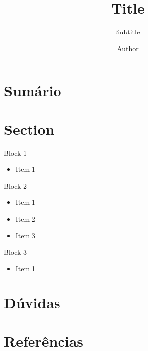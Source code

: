 \documentclass{custom-beamer}
\title{Title}
\subtitle{Subtitle}
\author{Author}
\institute{Institute}
\date{\the\year}
\begin{document}
\begin{frame}[fragile]
\titlepage
\end{frame}

\section{Sumário}

\begin{frame}[fragile]
\tableofcontents
\end{frame}

\section{Section}

\begin{frame}[fragile]
\begin{block}{Block 1}
\begin{itemize}
	\item Item 1 \cite{vapnik2000nature}
\end{itemize}
\end{block}
\begin{block}{Block 2}
\begin{itemize}
	\item Item 1
	\item Item 2
	\item Item 3
\end{itemize}
\end{block}
\begin{block}{Block 3}
\begin{itemize}
	\item Item 1
\end{itemize}
\end{block}
\end{frame}

\section{Dúvidas}

\begin{frame}[fragile]
\questionspage
\end{frame}

\section{Referências}

\begin{frame}[fragile]

\end{frame}
\end{document}
